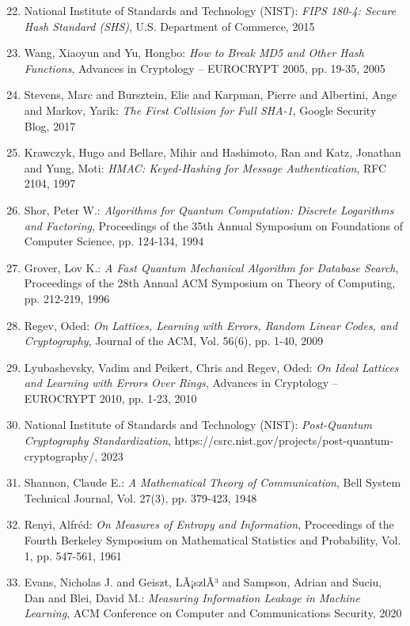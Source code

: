 ﻿\documentclass[12pt,a4paper]{article}
\begin{document}
	\begin{enumerate}
		\setcounter{enumi}{21}
		\item National Institute of Standards and Technology (NIST): \textit{FIPS 180-4: Secure Hash Standard (SHS)}, U.S. Department of Commerce, 2015
		\item Wang, Xiaoyun and Yu, Hongbo: \textit{How to Break MD5 and Other Hash Functions}, Advances in Cryptology -- EUROCRYPT 2005, pp. 19-35, 2005
		\item Stevens, Marc and Bursztein, Elie and Karpman, Pierre and Albertini, Ange and Markov, Yarik: \textit{The First Collision for Full SHA-1}, Google Security Blog, 2017
		\item Krawczyk, Hugo and Bellare, Mihir and Hashimoto, Ran and Katz, Jonathan and Yung, Moti: \textit{HMAC: Keyed-Hashing for Message Authentication}, RFC 2104, 1997
	\end{enumerate}
	
	\begin{enumerate}
		\setcounter{enumi}{25}
		\item Shor, Peter W.: \textit{Algorithms for Quantum Computation: Discrete Logarithms and Factoring}, Proceedings of the 35th Annual Symposium on Foundations of Computer Science, pp. 124-134, 1994
		\item Grover, Lov K.: \textit{A Fast Quantum Mechanical Algorithm for Database Search}, Proceedings of the 28th Annual ACM Symposium on Theory of Computing, pp. 212-219, 1996
		\item Regev, Oded: \textit{On Lattices, Learning with Errors, Random Linear Codes, and Cryptography}, Journal of the ACM, Vol. 56(6), pp. 1-40, 2009
		\item Lyubashevsky, Vadim and Peikert, Chris and Regev, Oded: \textit{On Ideal Lattices and Learning with Errors Over Rings}, Advances in Cryptology -- EUROCRYPT 2010, pp. 1-23, 2010
		\item National Institute of Standards and Technology (NIST): \textit{Post-Quantum Cryptography Standardization}, https://csrc.nist.gov/projects/post-quantum-cryptography/, 2023
	\end{enumerate}
	
	\begin{enumerate}
		\setcounter{enumi}{30}
		\item Shannon, Claude E.: \textit{A Mathematical Theory of Communication}, Bell System Technical Journal, Vol. 27(3), pp. 379-423, 1948
		\item Renyi, Alfréd: \textit{On Measures of Entropy and Information}, Proceedings of the Fourth Berkeley Symposium on Mathematical Statistics and Probability, Vol. 1, pp. 547-561, 1961
		\item Evans, Nicholas J. and Geiszt, LÃ¡szlÃ³ and Sampson, Adrian and Suciu, Dan and Blei, David M.: \textit{Measuring Information Leakage in Machine Learning}, ACM Conference on Computer and Communications Security, 2020
	\end{enumerate}
	
\end{document}
